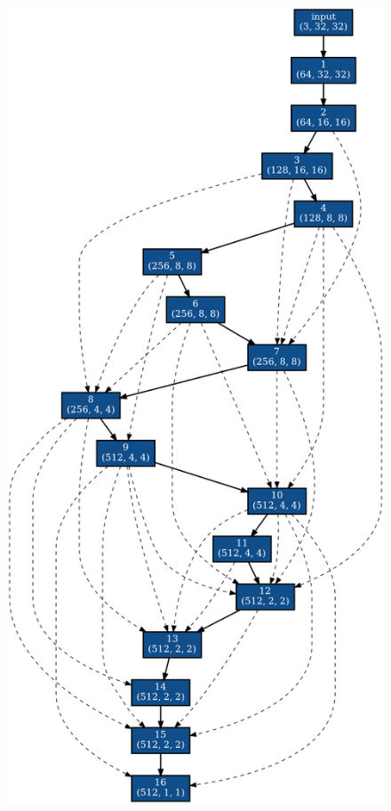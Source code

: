 \begin{figure}[tb]
 \begin{minipage}{0.49\hsize}
 	\begin{center}
    \includegraphics[clip,scale=0.19]{./fig/04.exp/normal_last.png}\\

\end{center}
\end{minipage}
\end{figure}

